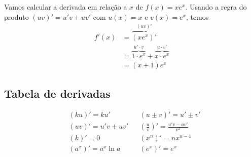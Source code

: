 \cleardoublepage\documentclass[../main.tex]{subfiles}
\begin{document}
\begin{ex}
  Vamos calcular a derivada em relação a $x$ de $f(x) = xe^x$. Usando a regra do produto $(uv)' = u'v + uv'$ com $u(x) = x$ e $v(x) = e^x$, temos
  \begin{align*}
    f'(x) &= \overbrace{(xe^x)'}^{(uv)'}\\
          &= \overbrace{1\cdot e^x}^{u'\cdot v} + \overbrace{x\cdot e^x}^{u\cdot v'}\\
          &= (x + 1)e^x
  \end{align*}
\end{ex}

\subsection{Tabela de derivadas}

\begin{align*}
  &(ku)' = ku' && (u\pm v)' = u' \pm v'\\
  &(uv)' = u'v + uv' && \left(\frac{u}{v}\right)' = \frac{u'v - uv'}{v^2} \\
  &(k)' = 0 && (x^n)' = nx^{n-1}\\
  &(a^x)' = a^x\ln a && (e^x)' = e^x \\
\end{align*}
\end{document}
